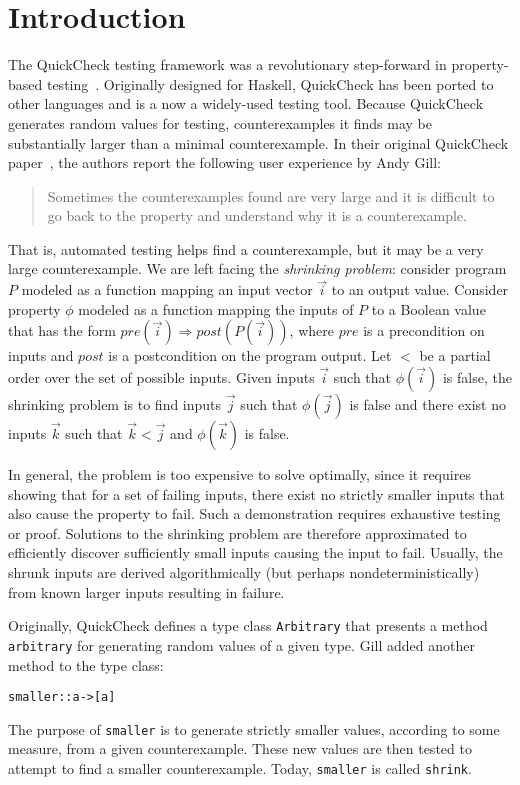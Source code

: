 \documentclass{sigplanconf}
\newenvironment{code}{\begin{alltt}\footnotesize}{\end{alltt}}
\newcommand{\ttp}[1]{\texttt{#1}}
\begin{document}
\section{Introduction}\label{sec:intro}
The QuickCheck testing framework was a revolutionary step-forward in
property-based testing~\cite{qc,monadic}.  Originally designed for Haskell,
QuickCheck has been ported to other languages and is a now a widely-used testing
tool.  Because QuickCheck generates random values for testing, counterexamples
it finds may be substantially larger than a minimal counterexample.  In their
original QuickCheck paper~\cite{qc}, the authors report the following user
experience by Andy Gill:
%
\begin{quote}
Sometimes the counterexamples found are very large and it is difficult to go
back to the property and understand why it is a counterexample.
\end{quote}

That is, automated testing helps find a counterexample, but it may be a very
large counterexample.  We are left facing the \emph{shrinking problem}: consider
program $P$ modeled as a function mapping an input vector $\vec{i}$ to an output
value.  Consider property $\phi$ modeled as a function mapping the inputs of $P$
to a Boolean value that has the form $pre(\vec{i}) \Longrightarrow
post(P(\vec{i}))$, where $pre$ is a precondition on inputs and $post$ is a
postcondition on the program output.  Let $<$ be a partial order over the set of
possible inputs.  Given inputs $\vec{i}$ such that $\phi(\vec{i})$ is false, the
shrinking problem is to find inputs $\vec{j}$ such that $\phi(\vec{j})$ is false
and there exist no inputs $\vec{k}$ such that $\vec{k} < \vec{j}$ and
$\phi(\vec{k})$ is false.

In general, the problem is too expensive to solve optimally, since it requires
showing that for a set of failing inputs, there exist no strictly smaller inputs
that also cause the property to fail.  Such a demonstration requires exhaustive
testing or proof.  Solutions to the shrinking problem are therefore approximated
to efficiently discover sufficiently small inputs causing the input to fail.
Usually, the shrunk inputs are derived algorithmically (but perhaps
nondeterministically) from known larger inputs resulting in failure.

Originally, QuickCheck defines a type class
\ttp{Arbitrary} that presents a method \ttp{arbitrary} for generating random
values of a given type.  Gill added another method to the type class:
%
\begin{code}
smaller :: a -> [a]
\end{code}
%
\noindent
The purpose of \ttp{smaller} is to generate strictly smaller values, according
to some measure, from a given counterexample.  These new values are then tested
to attempt to find a smaller counterexample.  Today, \ttp{smaller} is called
\ttp{shrink}.
\end{document}
